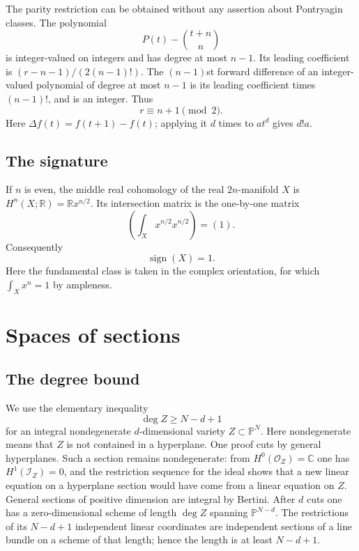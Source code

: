 \documentclass[11pt,reqno,letterpaper]{amsart}
\newcommand{\C}{\mathbb C}
\newcommand{\PP}{\mathbb P}
\newcommand{\sgn}{\operatorname{sign}}
\newcommand{\OO}{\mathcal O}
\theoremstyle{definition}
\numberwithin{equation}{section}
\begin{document}
The parity restriction can be obtained without any assertion about Pontryagin
classes. The polynomial
\[
 P(t)-\binom{t+n}{n}
\]
is integer-valued on integers and has degree at most $n-1$. Its leading
coefficient is $(r-n-1)/(2(n-1)!)$. The $(n-1)$st forward difference of an
integer-valued polynomial of degree at most $n-1$ is its leading coefficient
times $(n-1)!$, and is an integer. Thus
\begin{equation}\label{eq:parity}
 r\equiv n+1\pmod2.
\end{equation}
Here $\Delta f(t)=f(t+1)-f(t)$;
applying it $d$ times to $at^d$ gives $d!a$.

\subsection{The signature}
If $n$ is even, the middle real cohomology of the real $2n$-manifold $X$ is
$H^n(X;\mathbb R)=\mathbb R x^{n/2}$. Its intersection matrix is the
one-by-one matrix
\[
 \left(\int_Xx^{n/2}x^{n/2}\right)=(1).
\]
Consequently
\begin{equation}\label{eq:signatureone}
 \sgn(X)=1.
\end{equation}
Here the fundamental class is taken in the complex orientation, for which
$\int_Xx^n=1$ by ampleness.

\section{Spaces of sections}\label{sec:sections}

\subsection{The degree bound}
We use the elementary inequality
\begin{equation}\label{eq:min-degree}
 \deg Z\ge N-d+1
\end{equation}
for an integral nondegenerate $d$-dimensional variety $Z\subset\PP^N$.
Here nondegenerate means that $Z$ is not contained in a hyperplane.
One proof cuts by general hyperplanes. Such a section remains nondegenerate:
from $H^0(\OO_Z)=\C$ one has $H^1(\mathcal I_Z)=0$, and the restriction
sequence for the ideal shows that a new linear equation on a hyperplane
section would have come from a linear equation on $Z$.
General sections of positive dimension are integral by Bertini.
After $d$ cuts one has a zero-dimensional scheme of length $\deg Z$
spanning $\PP^{N-d}$. The restrictions of its $N-d+1$ independent linear
coordinates are independent sections of a line bundle on a scheme of that
length; hence the length is at least $N-d+1$.
\end{document}
